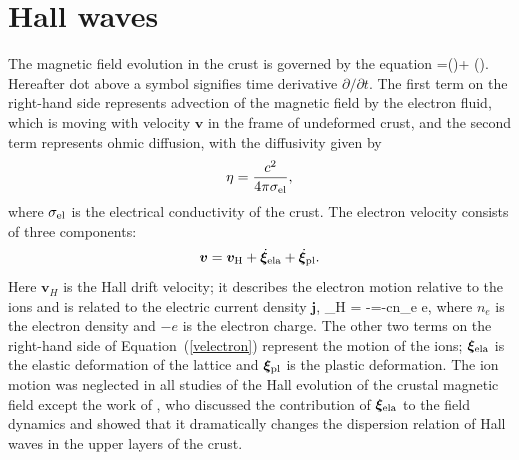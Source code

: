 \section{Hall waves}
\label{dyn}
The magnetic field evolution in the crust is governed by the equation
\beq
{}=\nabla\times\left(\times{}\right)+
\nabla\times\left(\eta\nabla\times{}\right).
\eeq
Hereafter dot above a symbol signifies time derivative $\partial/\partial t$.
The first term on the right-hand side represents advection of the magnetic field by the 
electron fluid, which is moving with 
velocity $\boldsymbol{v}$ in the frame of undeformed crust, 
and the second term represents  
ohmic diffusion, with the diffusivity given by
\begin{equation}
\eta={c^2\over 4\pi \sigma_{\rm el}}, 
\end{equation}
where
$\sigma_{\rm el}$ is the electrical conductivity of the crust. The electron velocity consists of three components: \begin{equation}
\boldsymbol{v}=\boldsymbol{v}_{\rm H}+\dot{\boldsymbol{\xi}}_{\rm ela}+\dot{\boldsymbol{\xi}}_{\rm pl}.
\label{velectron}
\end{equation}
 Here $\boldsymbol{v}_H$ is the Hall drift velocity; it describes the electron motion
 relative to the ions and is related to the 
 electric current density $\boldsymbol{j}$,
\beq
{}_{H} = -=-{c\pi n_e e}\nabla\times{},
\eeq
where $n_e$ is the electron density and 
$-e$ is the electron charge. 
The other two terms on the right-hand side of Equation~(\ref{velectron})
represent the motion of the ions; $\boldsymbol{\xi}_{\rm ela}$ is the elastic deformation 
of the lattice and $\boldsymbol{\xi}_{\rm pl}$ is the plastic deformation.
The ion motion was
neglected in all studies of the Hall evolution of the crustal 
magnetic field except the work of \citet{2004ApJ...609..999C}, who discussed the 
contribution of 
$\boldsymbol{\xi}_{\rm ela}$ to the field dynamics and showed that it 
dramatically changes the dispersion relation of Hall waves in the upper layers of the crust.

